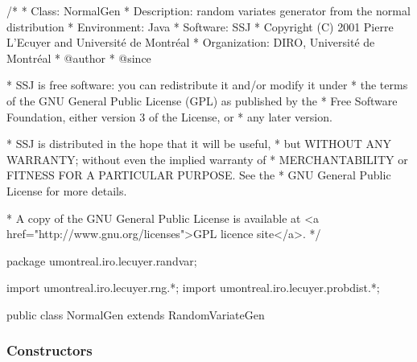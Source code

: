 \begin{code}
\begin{hide}
/*
 * Class:        NormalGen
 * Description:  random variates generator from the normal distribution
 * Environment:  Java
 * Software:     SSJ 
 * Copyright (C) 2001  Pierre L'Ecuyer and Université de Montréal
 * Organization: DIRO, Université de Montréal
 * @author       
 * @since

 * SSJ is free software: you can redistribute it and/or modify it under
 * the terms of the GNU General Public License (GPL) as published by the
 * Free Software Foundation, either version 3 of the License, or
 * any later version.

 * SSJ is distributed in the hope that it will be useful,
 * but WITHOUT ANY WARRANTY; without even the implied warranty of
 * MERCHANTABILITY or FITNESS FOR A PARTICULAR PURPOSE.  See the
 * GNU General Public License for more details.

 * A copy of the GNU General Public License is available at
   <a href="http://www.gnu.org/licenses">GPL licence site</a>.
 */
\end{hide}
package umontreal.iro.lecuyer.randvar;\begin{hide}
import umontreal.iro.lecuyer.rng.*;
import umontreal.iro.lecuyer.probdist.*;
\end{hide}

public class NormalGen extends RandomVariateGen \begin{hide} {
   protected double mu;
   protected double sigma = -1.0;
\end{hide}\end{code}

\subsubsection* {Constructors}

